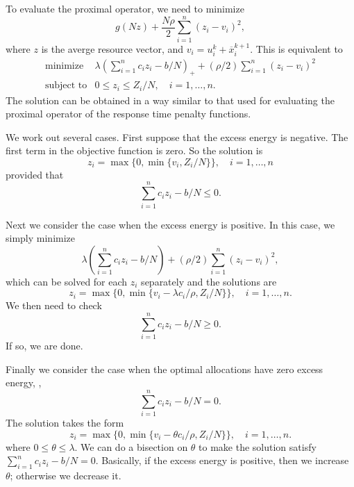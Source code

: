 To evaluate the proximal operator, we need to minimize
\[
    g(Nz) + \frac{N\rho}{2}\sum_{i=1}^n (z_i-v_i)^2,
\]
where $z$ is the averge resource vector, and
$v_i = u^k_i + \overline x^{k+1}_i$.
This is equivalent to
\[
\begin{array}{ll}
\mbox{minimize} &  \lambda\left(\sum_{i=1}^n c_i z_i - b/N\right)_+
     + (\rho/2)\sum_{i=1}^n (z_i-v_i)^2 \\
\mbox{subject to} & 0\leq z_i \leq Z_i/N, \quad i=1,\ldots,n.
\end{array}
\]
The solution can be obtained in a way similar to that used for evaluating 
the proximal operator of the response time penalty functions.

We work out several cases. 
First suppose that the excess energy is negative. 
The first term in the objective function is zero. 
So the solution is
\[
    z_i = \max\{0, \min\{v_i, Z_i/N\}\}, \quad i=1,\ldots, n
\]
provided that
\[
    \sum_{i=1}^n c_i z_i - b/N \leq 0.
\]

Next we consider the case when the excess energy is positive.
In this case, we simply minimize
\[
    \lambda \left(\sum_{i=1}^n c_i z_i - b/N \right) 
    + (\rho/2)\sum_{i=1}^n (z_i-v_i)^2,
\]
which can be solved for each $z_i$ separately and the solutions are
\[
    z_i = \max\{0, \min\{v_i - \lambda c_i/\rho, Z_i/N\}\}, \quad i=1,\ldots, n.
\]
We then need to check
\[
    \sum_{i=1}^n c_i z_i - b/N \geq 0.
\]
If so, we are done.

Finally we consider the case when the optimal allocations have zero excess
energy, \ie,
\[
    \sum_{i=1}^n c_i z_i - b/N = 0.
\]
The solution takes the form
\[
    z_i = \max\{0, \min\{v_i - \theta c_i/\rho, Z_i/N\}\}, \quad i=1,\ldots, n.
\]
where $0\leq\theta\leq\lambda$.
We can do a bisection on $\theta$ to make the solution satisfy
$\sum_{i=1}^n c_i z_i-b/N=0$.
Basically, if the excess energy is positive, then we increase~$\theta$;
otherwise we decrease it.




